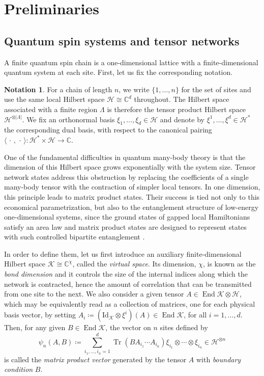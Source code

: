 \documentclass[a4paper,10pt]{amsart}
\newcommand{\eval}[2]{\langle #1 , #2\rangle}
\newcommand{\basisE}{\xi}
\newcommand{\placeholder}{\,\cdot\,}
\newcommand{\newterm}[1]{\emph{#1}}
\theoremstyle{definition}
\newtheorem*{notation}{Notation}
\begin{document}
\section{Preliminaries}
\label{sec:preliminaries}

\subsection{Quantum spin systems and tensor networks}
\label{subsec:quantumsys}

A finite quantum spin chain is a one-dimensional lattice with a finite-dimensional quantum system at each site. First, let us fix the corresponding notation.
\begin{notation}
For a chain of length $n$, we write $\{1,\ldots,n\}$ for the set of sites and use the same local Hilbert space $\mathscr{H}\cong\mathbb{C}^d$ throughout.
The Hilbert space associated with a finite region $\Lambda$ is therefore the tensor product Hilbert space $\mathscr{H}^{\otimes|\Lambda|}$.
We fix an orthonormal basis $\basisE_1,\ldots,\basisE_d\in\mathscr{H}$ and denote by $\basisE^1,\ldots,\basisE^d\in\mathscr{H}^*$ the corresponding dual basis, with respect to the canonical pairing $\eval{\placeholder}{\placeholder}:\mathscr{H}^*\times\mathscr{H}\to\mathbb{C}$.
\end{notation}

One of the fundamental difficulties in quantum many-body theory is that the dimension of this Hilbert space grows exponentially with the system size.
Tensor network states address this obstruction by replacing the coefficients of a single many-body tensor with the contraction of simpler local tensors.
In one dimension, this principle leads to matrix product states.
Their success is tied not only to this economical parametrization, but also to the entanglement structure of low-energy one-dimensional systems, since the ground states of gapped local Hamiltonians satisfy an area law and matrix product states are designed to represent states with such controlled bipartite entanglement \cite{hastings_area_2007,verstraete_matrix_2008}.

In order to define them, let us first introduce an auxiliary finite-dimensional Hilbert space $\mathscr{K}\cong \mathbb{C}^{\chi}$, called the \newterm{virtual space}.
Its dimension, $\chi$, is known as the \newterm{bond dimension} and it controls the size of the internal indices along which the network is contracted, hence the amount of correlation that can be transmitted from one site to the next.
We also consider a given tensor $A \in \operatorname{End}\mathscr{K} \otimes \mathscr{H}$, which may be equivalently read as a collection of matrices, one for each physical basis vector, by setting $ A_i \coloneqq (\mathrm{Id}_{\mathscr{K}}\otimes \basisE^i)(A) \in\operatorname{End}\mathscr{K}$, for all $i=1,\ldots,d$.
Then, for any given $B\in\operatorname{End}\mathscr{K}$, the vector on $n$ sites defined by
\[
    \psi_n(A,B)
    \coloneqq
    \sum_{i_1,\ldots,i_n=1}^{d}
        \operatorname{Tr}(B A_{i_1} \cdots A_{i_n})
        \basisE_{i_1}\otimes \cdots\otimes \basisE_{i_n}
    \in \mathscr{H}^{\otimes n}
\]
is called the \newterm{matrix product vector} generated by the tensor $A$ with \newterm{boundary condition} $B$.
\end{document}
